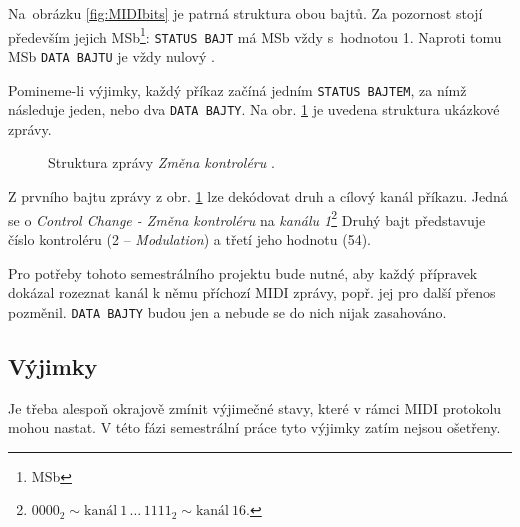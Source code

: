 Na~obrázku \ref{fig:MIDIbits} je patrná struktura obou bajtů. Za pozornost stojí především jejich \acs{MSb}\footnote{\acl{MSb}}: \texttt{STATUS~BAJT} má \acs{MSb} vždy s~hodnotou 1. Naproti tomu \acs{MSb} \texttt{DATA BAJTU} je vždy nulový  \cite{vkMIDI}.

Pomineme-li výjimky, každý příkaz začíná jedním \texttt{STATUS BAJTEM}, za nímž následuje jeden, nebo dva \texttt{DATA BAJTY}. Na obr. \ref{fig:MIDImsg} je uvedena struktura ukázkové zprávy.

\begin{figure}[h]
    \centering
    \caption{Struktura zprávy \emph{Změna kontroléru} \cite{MIDIspecs}.}
    \label{fig:MIDImsg}
\end{figure}

Z prvního bajtu zprávy z obr. \ref{fig:MIDImsg} lze dekódovat druh a cílový kanál příkazu. Jedná se o \emph{Control Change - Změna kontroléru} na \emph{kanálu 1}\footnote{$0000_2 \sim \mathrm{kanál\ 1}\,\ldots\,1111_2\sim\mathrm{kanál\ 16}$.} Druhý bajt představuje číslo kontroléru (2 -- \emph{Modulation}) a třetí jeho hodnotu (54).

Pro potřeby tohoto semestrálního projektu bude nutné, aby každý přípravek dokázal rozeznat kanál k němu příchozí \acs{MIDI} zprávy, popř. jej pro další přenos pozměnil. \texttt{DATA~BAJTY} budou jen  a nebude se do nich nijak zasahováno.

\subsection{Výjimky}\label{chpt:MIDIexcs}
Je třeba alespoň okrajově zmínit výjimečné stavy, které v rámci \acs{MIDI} protokolu mohou nastat. V této fázi semestrální práce tyto výjimky zatím nejsou ošetřeny.

